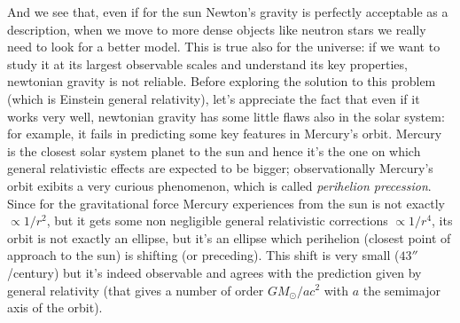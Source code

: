 And we see that, even if for the sun Newton's gravity is perfectly acceptable as a description, when we move to more dense objects like neutron stars we really need to look for a better model. This is true also for the universe: if we want to study it at its largest observable scales and understand its key properties, newtonian gravity is not reliable. Before exploring the solution to this problem (which is Einstein general relativity), let's appreciate the fact that even if it works very well, newtonian gravity has some little flaws also in the solar system: for example, it fails in predicting some key features in Mercury's orbit. Mercury is the closest solar system planet to the sun and hence it's the one on which general relativistic effects are expected to be bigger; observationally Mercury's orbit exibits a very curious phenomenon, which is called \textit{perihelion precession}. Since for the gravitational force Mercury experiences from the sun is not exactly $\propto 1/r^2$, but it gets some non 
negligible general relativistic corrections $\propto 1/r^4$, its orbit is not exactly an ellipse, but it's an ellipse which perihelion (closest point of approach to the sun) is shifting (or preceding). This shift is very small ($43''$/century) but it's indeed observable and agrees with the prediction given by general relativity (that gives a number of order $GM_\odot/ac^2$ with $a$ the semimajor axis of the orbit).  

